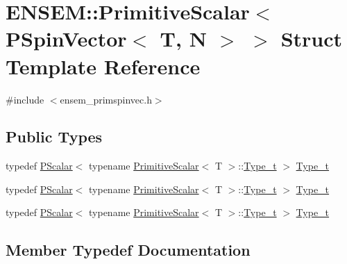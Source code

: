 \hypertarget{structENSEM_1_1PrimitiveScalar_3_01PSpinVector_3_01T_00_01N_01_4_01_4}{}\section{E\+N\+S\+EM\+:\+:Primitive\+Scalar$<$ P\+Spin\+Vector$<$ T, N $>$ $>$ Struct Template Reference}
\label{structENSEM_1_1PrimitiveScalar_3_01PSpinVector_3_01T_00_01N_01_4_01_4}


{\ttfamily \#include $<$ensem\+\_\+primspinvec.\+h$>$}

\subsection*{Public Types}
\begin{DoxyCompactItemize}
\item 
typedef \mbox{\hyperlink{classENSEM_1_1PScalar}{P\+Scalar}}$<$ typename \mbox{\hyperlink{structENSEM_1_1PrimitiveScalar}{Primitive\+Scalar}}$<$ T $>$\+::\mbox{\hyperlink{structENSEM_1_1PrimitiveScalar_3_01PSpinVector_3_01T_00_01N_01_4_01_4_ae74b3341c6408b55d594cc603d4ee470}{Type\+\_\+t}} $>$ \mbox{\hyperlink{structENSEM_1_1PrimitiveScalar_3_01PSpinVector_3_01T_00_01N_01_4_01_4_ae74b3341c6408b55d594cc603d4ee470}{Type\+\_\+t}}
\item 
typedef \mbox{\hyperlink{classENSEM_1_1PScalar}{P\+Scalar}}$<$ typename \mbox{\hyperlink{structENSEM_1_1PrimitiveScalar}{Primitive\+Scalar}}$<$ T $>$\+::\mbox{\hyperlink{structENSEM_1_1PrimitiveScalar_3_01PSpinVector_3_01T_00_01N_01_4_01_4_ae74b3341c6408b55d594cc603d4ee470}{Type\+\_\+t}} $>$ \mbox{\hyperlink{structENSEM_1_1PrimitiveScalar_3_01PSpinVector_3_01T_00_01N_01_4_01_4_ae74b3341c6408b55d594cc603d4ee470}{Type\+\_\+t}}
\item 
typedef \mbox{\hyperlink{classENSEM_1_1PScalar}{P\+Scalar}}$<$ typename \mbox{\hyperlink{structENSEM_1_1PrimitiveScalar}{Primitive\+Scalar}}$<$ T $>$\+::\mbox{\hyperlink{structENSEM_1_1PrimitiveScalar_3_01PSpinVector_3_01T_00_01N_01_4_01_4_ae74b3341c6408b55d594cc603d4ee470}{Type\+\_\+t}} $>$ \mbox{\hyperlink{structENSEM_1_1PrimitiveScalar_3_01PSpinVector_3_01T_00_01N_01_4_01_4_ae74b3341c6408b55d594cc603d4ee470}{Type\+\_\+t}}
\end{DoxyCompactItemize}


\subsection{Member Typedef Documentation}
\mbox{\label{structENSEM_1_1PrimitiveScalar_3_01PSpinVector_3_01T_00_01N_01_4_01_4_ae74b3341c6408b55d594cc603d4ee470}} 
